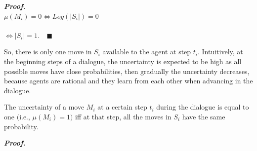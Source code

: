 \noindent\emph{\textbf{Proof.}}\\
\emph{$\mu(M_i)= 0 \Leftrightarrow Log(|S_i|)=0$\\
\\ $\Leftrightarrow  |S_i|=1$.~~$\blacksquare$}

So, there is only one move in $S_i$ available to the agent at step $t_i$. Intuitively, at the beginning steps of a dialogue, the
uncertainty is expected to be high as all possible moves have close probabilities, then gradually the uncertainty decreases,
because agents are rational and they learn from each other when advancing in the dialogue.

\begin{proposition}\label{proposition2}
The uncertainty of a move $M_i$ at a certain step $t_i$ during the dialogue is equal to one $($i.e., $\mu(M_i)=1)$ iff at that step,
all the moves in $S_i$ have the same probability.
\end{proposition}

\noindent\emph{\textbf{Proof.}}

